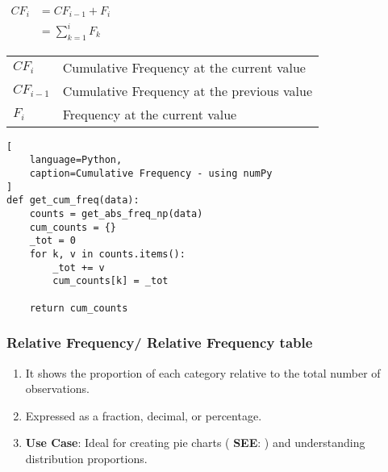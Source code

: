 \begin{table}[H]
    \begin{minipage}[H]{0.3\linewidth}
    $
        \begin{aligned}
            CF_i
                &= CF_{i-1} + F_{i} \\
                &= \sum_{k=1}^{i} F_{k}
        \end{aligned}
    $
    \end{minipage}
    \begin{minipage}[H]{0.65\linewidth}
        \begin{table}[H]
            \begin{tabular}{l l}
                $CF_i$ & Cumulative Frequency at the current value \\
                $CF_{i-1}$ & Cumulative Frequency at the previous value \\
                $F_i$ & Frequency at the current value \\
            \end{tabular}
        \end{table}
    \end{minipage}
\end{table}

\begin{lstlisting}[
    language=Python,
    caption=Cumulative Frequency - using numPy
]
def get_cum_freq(data):
    counts = get_abs_freq_np(data)
    cum_counts = {}
    _tot = 0
    for k, v in counts.items():
        _tot += v
        cum_counts[k] = _tot

    return cum_counts
\end{lstlisting}


\subsubsection{Relative Frequency/ Relative Frequency table \cite{statistics/book/Statistics-for-Data-Scientists/Maurits-Kaptein}}\label{Data/Describing Data/Frequency or Frequency table/Relative}

\begin{enumerate}
    \item It shows the proportion of each category relative to the total number of observations. \hfill \cite{common/online/chatgpt}

    \item Expressed as a fraction, decimal, or percentage. \hfill \cite{common/online/chatgpt}

    \item \textbf{Use Case}: Ideal for creating pie charts ( \textbf{SEE}:  ) and understanding distribution proportions. \hfill \cite{common/online/chatgpt}
\end{enumerate}


